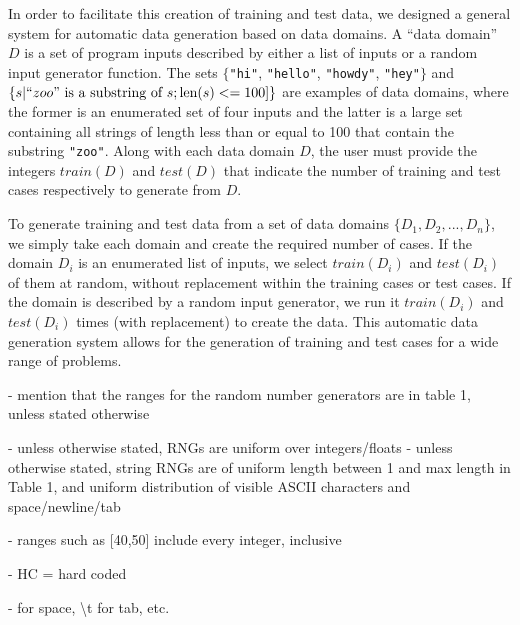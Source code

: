 \documentclass{sig-alternate}
\begin{document}

In order to facilitate this creation of training and test data, we designed a general system for automatic data generation based on data domains. A ``data domain'' $D$ is a set of program inputs described by either a list of inputs or a random input generator function. The sets $\{$\texttt{"hi"}, \texttt{"hello"}, \texttt{"howdy"}, \texttt{"hey"}$\}$ and $\{s | ``zoo" \text{ is a substring of } s; \text{len}(s) <= 100] \}$ are examples of data domains, where the former is an enumerated set of four inputs and the latter is a large set containing all strings of length less than or equal to 100 that contain the substring \texttt{"zoo"}. Along with each data domain $D$, the user must provide the integers $train(D)$ and $test(D)$ that indicate the number of training and test cases respectively to generate from $D$.

To generate training and test data from a set of data domains $\{D_1, D_2, ..., D_n \}$, we simply take each domain and create the required number of cases. If the domain $D_i$ is an enumerated list of inputs, we select $train(D_i)$ and $test(D_i)$ of them at random, without replacement within the training cases or test cases. If the domain is described by a random input generator, we run it $train(D_i)$ and $test(D_i)$ times (with replacement) to create the data. This automatic data generation system allows for the generation of training and test cases for a wide range of problems.


- mention that the ranges for the random number generators are in table 1, unless stated otherwise

- unless otherwise stated, RNGs are uniform over integers/floats
- unless otherwise stated, string RNGs are of uniform length between 1 and max length in Table 1, and uniform distribution of visible ASCII characters and space/newline/tab

- ranges such as [40,50] include every integer, inclusive

- HC = hard coded

- \textvisiblespace for space, \textbackslash t for tab, etc.

\end{document}
